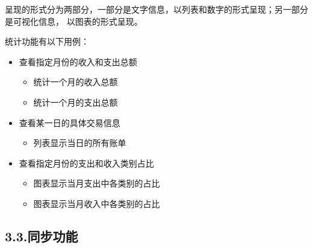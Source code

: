 \documentclass{article}
\begin{document}
呈现的形式分为两部分，一部分是文字信息，以列表和数字的形式呈现；另一部分是可视化信息，
以图表的形式呈现。%

统计功能有以下用例：%

\begin{itemize}[noitemsep,topsep=\mdcompacttopsep]%

\item{}查看指定月份的收入和支出总额

\begin{itemize}[noitemsep,topsep=\mdcompacttopsep]%

\item{}统计一个月的收入总额%

\item{}统计一个月的支出总额%
\end{itemize}%

\item{}查看某一日的具体交易信息

\begin{itemize}[noitemsep,topsep=\mdcompacttopsep]%

\item{}列表显示当日的所有账单%
\end{itemize}%

\item{}查看指定月份的支出和收入类别占比

\begin{itemize}[noitemsep,topsep=\mdcompacttopsep]%

\item{}图表显示当月支出中各类别的占比%

\item{}图表显示当月收入中各类别的占比%
\end{itemize}%
\end{itemize}%

\subsection{3.3.\hspace*{0.5em}同步功能}\label{section}%
\end{document}
